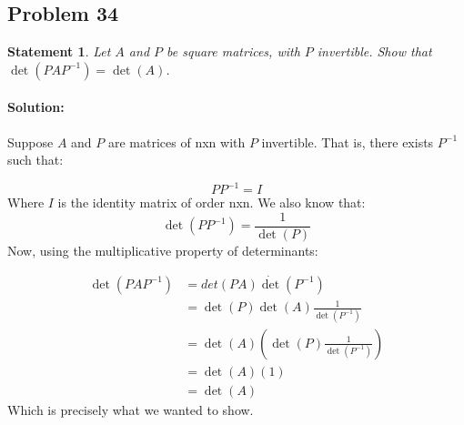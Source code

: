 \documentclass[12pt, letterpaper]{article}
\theoremstyle{statement}
\theoremstyle{statement}
\newtheorem*{atmStat}{Statement}
\newenvironment{Solution}{\noindent\ignorespaces\paragraph{Solution:}}{\hfill \ding{122}\par\noindent}
\begin{document}
    \subsection*{Problem 34}
    \begin{atmStat}
    Let $A$ and $P$ be square matrices, with $P$ invertible. Show that $\det(PAP^{-1})=\det(A)$.
    \end{atmStat}
    \begin{Solution}
    Suppose $A$ and $P$ are matrices of nxn with $P$ invertible. That is, there exists $P^{-1}$ such that:
    
    $$
    PP^{-1} = I
    $$
    Where $I$ is the identity matrix of order nxn. We also know that: 
    $$
    \det(PP^{-1}) = \frac{1}{\det(P)}
    $$
    Now, using the multiplicative property of determinants:
    
    \begin{align*}
        \det(PAP^{-1}) &= det(PA)\dot\det(P^{-1}) \\
        &= \det(P)\det(A)\frac{1}{\det(P^{-1})} \\
        &= \det(A)\left( \det(P) \frac{1}{\det(P^{-1})}\right) \\
        &= \det(A)(1) \\
        &= \det(A)
    \end{align*}
    Which is precisely what we wanted to show.
    \end{Solution}
    
\end{document}
